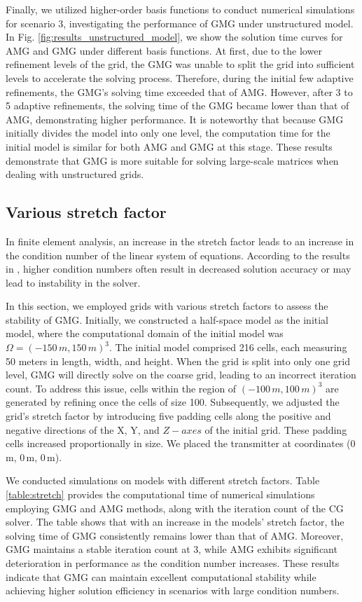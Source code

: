 \documentclass[extra, referee]{gji}
\begin{document}
Finally, we utilized higher-order basis functions to conduct numerical
simulations for scenario 3, investigating the performance of GMG under
unstructured model. In Fig. \ref{fig:results_unstructured_model}, we show the solution time
curves for AMG and GMG under different basis functions. At first, due to the
lower refinement levels of the grid, the GMG was unable to split the grid into
sufficient levels to accelerate the solving process. Therefore, during the
initial few adaptive refinements, the GMG's solving time exceeded that of AMG.
However, after 3 to 5 adaptive refinements, the solving time of the GMG became
lower than that of AMG, demonstrating higher performance. It is noteworthy that
because GMG initially divides the model into only one level, the computation
time for the initial model is similar for both AMG and GMG at this stage. These
results demonstrate that GMG is more suitable for solving large-scale matrices
when dealing with unstructured grids.


\subsection{Various stretch factor}
In finite element analysis, an increase in the stretch factor leads to an
increase in the condition number of the linear system of equations. According to
the results in \citep{Ern2006}, higher condition numbers often result in
decreased solution accuracy or may lead to instability in the solver.

In this section, we employed grids with various stretch factors to assess the
stability of GMG. Initially, we constructed a half-space model as the initial
model, where the computational domain of the initial model was $\Omega =
(-150\,m, 150\,m)^3$. The initial model comprised 216 cells, each measuring 50
meters in length, width, and height. When the grid is split into only one grid
level, GMG will directly solve on the coarse grid, leading to an incorrect
iteration count. To address this issue, cells within the region of
$(-100\,m,100\,m)^3$ are generated by refining once the cells of size 100.
Subsequently, we adjusted the grid's stretch factor by introducing five padding
cells along the positive and negative directions of the X, Y, and $Z-axes$ of
the initial grid. These padding cells increased proportionally in size. We
placed the transmitter at coordinates (0\,m, 0\,m, 0\,m).

We conducted simulations on models with different stretch factors. Table
\ref{table:stretch} provides the computational time of numerical simulations
employing GMG and AMG methods, along with the iteration count of the CG solver.
The table shows  that with an increase in the models' stretch factor, the
solving time of GMG consistently remains lower than that of AMG. Moreover, GMG
maintains a stable iteration count at 3, while AMG exhibits significant
deterioration in performance as the condition number increases. These results
indicate that GMG can maintain excellent computational stability while achieving
higher solution efficiency in scenarios with large condition numbers.
\end{document}
